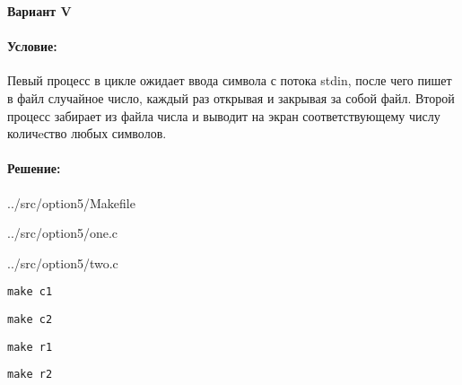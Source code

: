 \begin{center}
    \textbf{Вариант V}
\end{center}

\paragraph{Условие:}

Певый процесс в цикле ожидает ввода символа с потока stdin,
после чего пишет в файл случайное число,
каждый раз открывая и закрывая за собой файл.
Второй процесс забирает из файла числа
и выводит на экран соответствующему числу количeство любых символов.

\paragraph{Решение:} \hspace{0pt}


{../src/option5/Makefile}


{../src/option5/one.c}


{../src/option5/two.c}

\newpage

\noindent\begin{minipage}{.47\textwidth}
    \begin{lstlisting}[name=Tetminal 1,]
make c1
    \end{lstlisting}
\end{minipage}
\hfill
\begin{minipage}{.47\textwidth}
    \begin{lstlisting}[name=Tetminal 2,]
make c2
    \end{lstlisting}
\end{minipage}

\noindent\begin{minipage}{.47\textwidth}
    \begin{lstlisting}[name=Tetminal 1,]
make r1
    \end{lstlisting}
\end{minipage}
\hfill
\begin{minipage}{.47\textwidth}
    \begin{lstlisting}[name=Tetminal 2,]
make r2
    \end{lstlisting}
\end{minipage}

